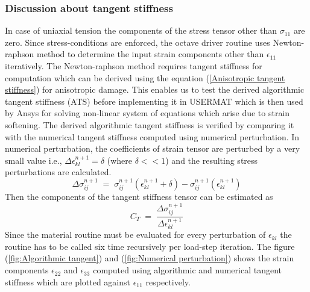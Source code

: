 \documentclass[a4paper,12pt]{extarticle}
\begin{document}
\subsubsection*{Discussion about tangent stiffness}
\indent\indent\indent In case of uniaxial tension the components of the stress tensor other than $\sigma_{11}$ are zero. Since stress-conditions are enforced, the octave driver routine uses Newton-raphson method to determine the input strain components other than $\epsilon_{11}$ iteratively. The Newton-raphson method requires tangent stiffness for computation which can be derived using the equation (\ref{Anisotropic tangent stiffness}) for anisotropic damage. This enables us to test the derived algorithmic tangent stiffness (ATS) before implementing it in USERMAT which is then used by Ansys for solving non-linear system of equations which arise due to strain softening. The derived algorithmic tangent stiffness is verified by comparing it with the numerical tangent stiffness computed using numerical perturbation. In numerical perturbation, the coefficients of strain tensor are perturbed by a very small value i.e.,  $\Delta\epsilon_{kl}^{n+1} = \delta$ (where $\delta<<1$) and the resulting stress perturbations are calculated. 
\begin{equation}
\Delta\sigma_{ij}^{n+1} \; = \; \sigma_{ij}^{n+1}(\epsilon_{kl}^{n+1}+\delta) - \sigma_{ij}^{n+1}(\epsilon_{kl}^{n+1})
\end{equation}
Then the components of the tangent stiffness tensor can be estimated as
\begin{equation}
 C_T \;  =  \;  \frac{\Delta\sigma_{ij}^{n+1}}{\Delta\epsilon_{kl}^{n+1}}
\end{equation}
Since the material routine must be evaluated for every perturbation of $\epsilon_{kl}$ the routine has to be called six time recursively per load-step iteration. The figure (\ref{fig:Algorithmic tangent})  and (\ref{fig:Numerical perturbation}) shows the strain components $\epsilon_{22}$ and $\epsilon_{33}$ computed using algorithmic and numerical tangent stiffness which are plotted against $\epsilon_{11}$  respectively.\\
\\
\end{document}
